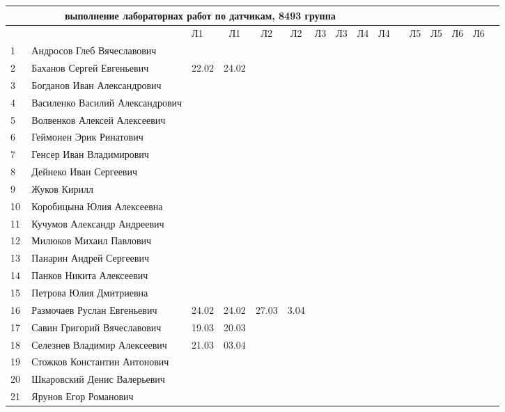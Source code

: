 \documentclass[a4paper,landscape,11pt]{article}
\begin{document}
\newpage
%
\begin{tabular}{l|llccccccccccccc}
\multicolumn{10}{c}{выполнение лабораторнах работ по датчикам, 8493 группа} \\
\toprule
&&Л1&Л1& Л2&Л2& Л3&Л3& Л4&Л4& &Л5&Л5& Л6&Л6\\
\midrule
1\,&  Андросов Глеб Вячеславович      &      &      &&&&&&\\
2\,&  Баханов Сергей Евгеньевич       & 22.02& 24.02&&&&&&\\
3\,&  Богданов Иван Александрович     &      &      &&&&&&\\
4\,&  Василенко Василий Александрович &      &      &&&&&&\\
5\,&  Волвенков Алексей Алексеевич    &      &      &&&&&&\\
\midrule                                            
6\,&  Геймонен Эрик Ринатович         &      &      &&&&&&\\
7\,&  Генсер Иван Владимирович        &      &      &&&&&&\\
8\,&  Дейнеко Иван Сергеевич          &      &      &&&&&&\\
9\,&  Жуков Кирилл                    &      &      &&&&&&\\
10\,& Коробицына Юлия Алексеевна      &      &      &&&&&&\\
\midrule                                            
11\,& Кучумов Александр Андреевич     &      &      &&&&&&\\
12\,& Милюков Михаил Павлович         &      &      &&&&&&\\
13\,& Панарин Андрей Сергеевич        &      &      &&&&&&\\
14\,& Панков Никита Алексеевич        &      &      &&&&&&\\
15\,& Петрова Юлия Дмитриевна         &      &      &&&&&&\\
\midrule                                            
16\,& Размочаев Руслан Евгеньевич     & 24.02& 24.02& 27.03&  3.04&&&&\\
17\,& Савин Григорий Вячеславович     & 19.03& 20.03&&&&&&\\
18\,& Селезнев Владимир Алексеевич    & 21.03& 03.04&&&&&&\\
19\,& Стожков Константин Антонович    &      &      &&&&&&\\
20\,& Шкаровский Денис Валерьевич     &      &      &&&&&&\\
\midrule                                            
21\,& Ярунов Егор Романович           &      &      &&&&&&\\
\bottomrule
\end{tabular}
\end{document}
